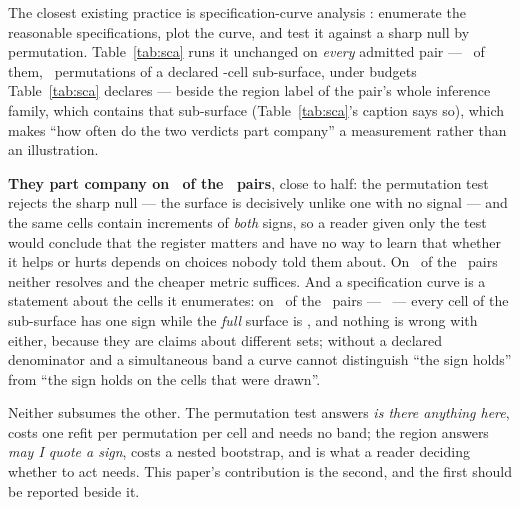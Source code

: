 The closest existing practice is specification-curve analysis
\citep{simonsohn2020specification}: enumerate the reasonable specifications,
plot the curve, and test it against a sharp null by permutation.
Table~\ref{tab:sca} runs it unchanged on \emph{every} admitted pair ---
\nScaPairs\ of them, \nScaPerms\ permutations of a declared
\nScaCells-cell sub-surface, under budgets Table~\ref{tab:sca}
declares --- beside the region label of the pair's whole inference family,
which contains that sub-surface (Table~\ref{tab:sca}'s caption says so), which makes
``how often do the two verdicts part company'' a measurement rather than an
illustration.

\textbf{They part company on \nScaDisagree\ of the \nScaPairs\ pairs}, close
to half: the permutation test rejects the sharp null --- the surface is
decisively unlike one with no signal --- and the same cells contain
increments of \emph{both} signs, so a reader given only the test would
conclude that the register matters and have no way to learn that whether it
helps or hurts depends on choices nobody told them about. On
\nScaAgreeNull\ of the \nScaPairs\ pairs neither resolves and the cheaper
metric suffices. And a specification curve is a statement about the
cells it enumerates: on \nScaSubSurfaceDisagree\ of the \nScaPairs\ pairs
--- \scaSubSurfacePair\ --- every cell of the sub-surface has one sign while
the \emph{full} surface is \scaSubSurfaceRegion, and nothing is wrong with
either, because they are claims about different sets; without a declared
denominator and a simultaneous band a curve cannot distinguish ``the sign
holds'' from ``the sign holds on the cells that were drawn''.

Neither subsumes the other. The permutation test answers \emph{is there
anything here}, costs one refit per permutation per cell and needs no band;
the region answers \emph{may I quote a sign}, costs a nested bootstrap, and is
what a reader deciding whether to act needs. This paper's contribution is the
second, and the first should be reported beside it.

